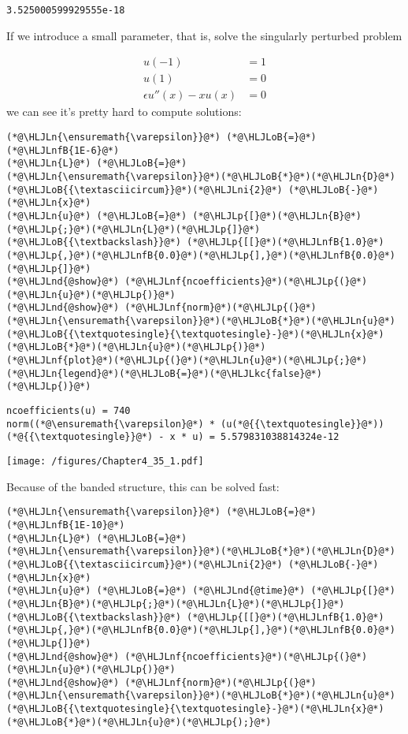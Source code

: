 \documentclass[12pt,landscape]{article}
\newcommand{\HLJLkc}[1]{\textcolor[RGB]{59,151,46}{\textit{#1}}}
\newcommand{\HLJLn}[1]{#1}
\newcommand{\HLJLnd}[1]{\textcolor[RGB]{214,102,97}{#1}}
\newcommand{\HLJLnf}[1]{\textcolor[RGB]{66,102,213}{#1}}
\newcommand{\HLJLnfB}[1]{\textcolor[RGB]{59,151,46}{#1}}
\newcommand{\HLJLni}[1]{\textcolor[RGB]{59,151,46}{#1}}
\newcommand{\HLJLoB}[1]{\textcolor[RGB]{102,102,102}{\textbf{#1}}}
\newcommand{\HLJLp}[1]{#1}
\begin{document}
{\begin{lstlisting}
3.525000599929555e-18
\end{lstlisting}


If we introduce a small parameter, that is, solve the singularly perturbed problem


\begin{align*}
u(-1) &= 1\\
u(1) &= 0\\
\epsilon u''(x) - xu(x) &= 0
\end{align*}
we can see it's pretty hard to compute solutions:


\begin{lstlisting}
(*@\HLJLn{\ensuremath{\varepsilon}}@*) (*@\HLJLoB{=}@*) (*@\HLJLnfB{1E-6}@*)
(*@\HLJLn{L}@*) (*@\HLJLoB{=}@*) (*@\HLJLn{\ensuremath{\varepsilon}}@*)(*@\HLJLoB{*}@*)(*@\HLJLn{D}@*)(*@\HLJLoB{{\textasciicircum}}@*)(*@\HLJLni{2}@*) (*@\HLJLoB{-}@*) (*@\HLJLn{x}@*)
(*@\HLJLn{u}@*) (*@\HLJLoB{=}@*) (*@\HLJLp{[}@*)(*@\HLJLn{B}@*)(*@\HLJLp{;}@*)(*@\HLJLn{L}@*)(*@\HLJLp{]}@*) (*@\HLJLoB{{\textbackslash}}@*) (*@\HLJLp{[[}@*)(*@\HLJLnfB{1.0}@*)(*@\HLJLp{,}@*)(*@\HLJLnfB{0.0}@*)(*@\HLJLp{],}@*)(*@\HLJLnfB{0.0}@*)(*@\HLJLp{]}@*)
(*@\HLJLnd{@show}@*) (*@\HLJLnf{ncoefficients}@*)(*@\HLJLp{(}@*)(*@\HLJLn{u}@*)(*@\HLJLp{)}@*)
(*@\HLJLnd{@show}@*) (*@\HLJLnf{norm}@*)(*@\HLJLp{(}@*)(*@\HLJLn{\ensuremath{\varepsilon}}@*)(*@\HLJLoB{*}@*)(*@\HLJLn{u}@*)(*@\HLJLoB{{\textquotesingle}{\textquotesingle}-}@*)(*@\HLJLn{x}@*)(*@\HLJLoB{*}@*)(*@\HLJLn{u}@*)(*@\HLJLp{)}@*)
(*@\HLJLnf{plot}@*)(*@\HLJLp{(}@*)(*@\HLJLn{u}@*)(*@\HLJLp{;}@*) (*@\HLJLn{legend}@*)(*@\HLJLoB{=}@*)(*@\HLJLkc{false}@*)(*@\HLJLp{)}@*)
\end{lstlisting}

\begin{lstlisting}
ncoefficients(u) = 740
norm((*@\ensuremath{\varepsilon}@*) * (u(*@{{\textquotesingle}}@*))(*@{{\textquotesingle}}@*) - x * u) = 5.579831038814324e-12
\end{lstlisting}

\texttt{[image: /figures/Chapter4\_35\_1.pdf]}

Because of the banded structure, this can be solved fast:


\begin{lstlisting}
(*@\HLJLn{\ensuremath{\varepsilon}}@*) (*@\HLJLoB{=}@*) (*@\HLJLnfB{1E-10}@*)
(*@\HLJLn{L}@*) (*@\HLJLoB{=}@*) (*@\HLJLn{\ensuremath{\varepsilon}}@*)(*@\HLJLoB{*}@*)(*@\HLJLn{D}@*)(*@\HLJLoB{{\textasciicircum}}@*)(*@\HLJLni{2}@*) (*@\HLJLoB{-}@*) (*@\HLJLn{x}@*)
(*@\HLJLn{u}@*) (*@\HLJLoB{=}@*) (*@\HLJLnd{@time}@*) (*@\HLJLp{[}@*)(*@\HLJLn{B}@*)(*@\HLJLp{;}@*)(*@\HLJLn{L}@*)(*@\HLJLp{]}@*) (*@\HLJLoB{{\textbackslash}}@*) (*@\HLJLp{[[}@*)(*@\HLJLnfB{1.0}@*)(*@\HLJLp{,}@*)(*@\HLJLnfB{0.0}@*)(*@\HLJLp{],}@*)(*@\HLJLnfB{0.0}@*)(*@\HLJLp{]}@*)
(*@\HLJLnd{@show}@*) (*@\HLJLnf{ncoefficients}@*)(*@\HLJLp{(}@*)(*@\HLJLn{u}@*)(*@\HLJLp{)}@*)
(*@\HLJLnd{@show}@*) (*@\HLJLnf{norm}@*)(*@\HLJLp{(}@*)(*@\HLJLn{\ensuremath{\varepsilon}}@*)(*@\HLJLoB{*}@*)(*@\HLJLn{u}@*)(*@\HLJLoB{{\textquotesingle}{\textquotesingle}-}@*)(*@\HLJLn{x}@*)(*@\HLJLoB{*}@*)(*@\HLJLn{u}@*)(*@\HLJLp{);}@*)
\end{lstlisting}

}
\end{document}

